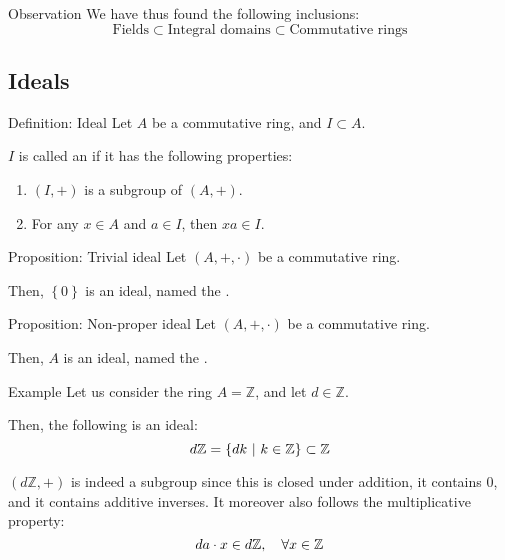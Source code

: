 \documentclass[a4paper]{article}
\begin{document}
\begin{parag}{Observation}
    We have thus found the following inclusions:
    \[\text{Fields} \subset \text{Integral domains} \subset \text{Commutative rings}\]
\end{parag}

\subsection{Ideals}

\begin{parag}{Definition: Ideal}
    Let $A$ be a commutative ring, and $I \subset A$.

    $I$ is called an  if it has the following properties:
    \begin{enumerate}
        \item $\left(I, +\right)$ is a subgroup of $\left(A, +\right)$.
        \item For any $x \in A$ and $a \in I$, then $xa \in I$.
    \end{enumerate}
\end{parag}

\begin{parag}{Proposition: Trivial ideal}
    Let $\left(A, +, \cdot \right)$ be a commutative ring.

    Then, $\left\{0\right\}$ is an ideal, named the .
\end{parag}

\begin{parag}{Proposition: Non-proper ideal}
    Let $\left(A, +, \cdot \right)$ be a commutative ring.

    Then, $A$ is an ideal, named the .
\end{parag}

\begin{parag}{Example}
    Let us consider the ring $A = \mathbb{Z}$, and let $d \in \mathbb{Z}$. 

    Then, the following is an ideal: 
    \[d\mathbb{Z} = \left\{dk \suchthat k \in \mathbb{Z}\right\} \subset \mathbb{Z}\]
    
    $\left(d\mathbb{Z}, +\right)$ is indeed a subgroup since this is closed under addition, it contains $0$, and it contains additive inverses. It moreover also follows the multiplicative property: 
    \[da \cdot  x \in d\mathbb{Z}, \quad \forall x \in \mathbb{Z}\]
\end{parag}
\end{document}
